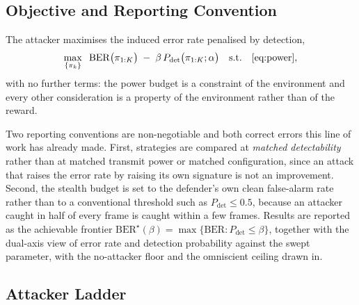 \subsection{Objective and Reporting Convention}
\label{sec:system:objective}

The attacker maximises the induced error rate penalised by detection,
\begin{equation}
  \max_{\{\pi_k\}} \;\; \mathrm{BER}\bigl(\pi_{1:K}\bigr) \;-\; \beta \, P_{\mathrm{det}}\bigl(\pi_{1:K}; \alpha\bigr)
  \quad \text{s.t.} \quad \eqref{eq:power},
  \label{eq:obj}
\end{equation}
with no further terms: the power budget is a constraint of the environment and every other consideration is a property of the environment rather than of the reward.

Two reporting conventions are non-negotiable and both correct errors this line of work has already made.
First, strategies are compared at \emph{matched detectability} rather than at matched transmit power or matched configuration, since an attack that raises the error rate by raising its own signature is not an improvement.
Second, the stealth budget is set to the defender's own clean false-alarm rate rather than to a conventional threshold such as $P_{\mathrm{det}} \le 0.5$, because an attacker caught in half of every frame is caught within a few frames.
Results are reported as the achievable frontier $\mathrm{BER}^\star(\beta) = \max\{\mathrm{BER} : P_{\mathrm{det}} \le \beta\}$, together with the dual-axis view of error rate and detection probability against the swept parameter, with the no-attacker floor and the omniscient ceiling drawn in.

\subsection{Attacker Ladder}
\label{sec:system:ladder}

